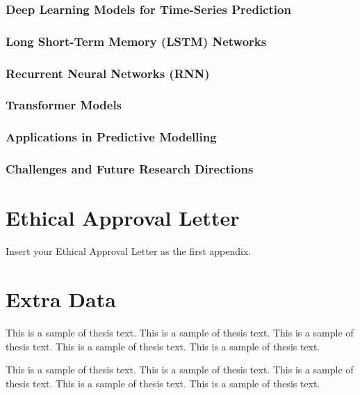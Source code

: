 \documentclass[12pt,oneside]{book} %
\begin{document}
\subsection{Deep Learning Models for Time-Series Prediction}
\subsection{Long Short-Term Memory (LSTM) Networks}
\subsection{Recurrent Neural Networks (RNN)}
\subsection{Transformer Models}
\subsection{Applications in Predictive Modelling}
\subsection{Challenges and Future Research Directions}

%




\appendix
\chapter{Ethical Approval Letter}
Insert your Ethical Approval Letter as the first appendix.

\chapter{Extra Data}
This is a sample of thesis text. This is a sample of thesis text. This is a
sample of thesis text. This is a sample of thesis text. This is a sample of
thesis text.

This is a sample of thesis text. This is a sample of thesis text. This is a
sample of thesis text. This is a sample of thesis text. This is a sample of
thesis text.
\end{document}
